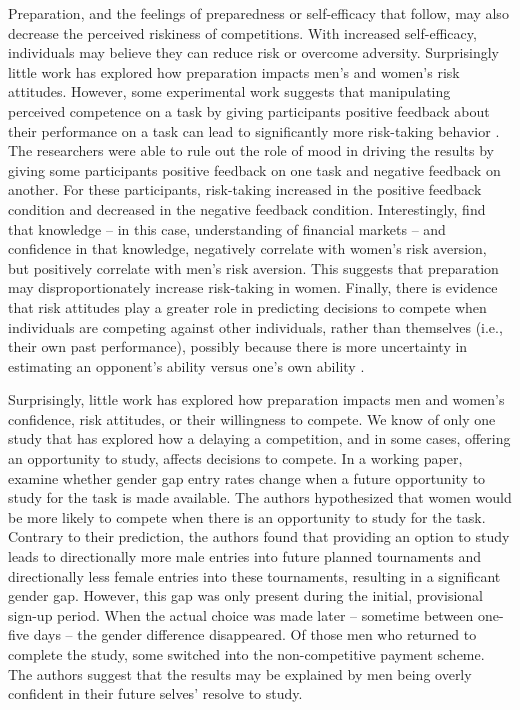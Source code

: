 \documentclass[a4paper, nobind]{templates/ociamthesis}
\begin{document}
Preparation, and the feelings of preparedness or self-efficacy that follow, may also decrease the perceived riskiness of competitions. With increased self-efficacy, individuals may believe they can reduce risk or overcome adversity. Surprisingly little work has explored how preparation impacts men's and women's risk attitudes. However, some experimental work suggests that manipulating perceived competence on a task by giving participants positive feedback about their performance on a task can lead to significantly more risk-taking behavior \autocite{Krueger1994}. The researchers were able to rule out the role of mood in driving the results by giving some participants positive feedback on one task and negative feedback on another. For these participants, risk-taking increased in the positive feedback condition and decreased in the negative feedback condition. Interestingly, \textcite{Gysler2002} find that knowledge -- in this case, understanding of financial markets -- and confidence in that knowledge, negatively correlate with women's risk aversion, but positively correlate with men's risk aversion. This suggests that preparation may disproportionately increase risk-taking in women. Finally, there is evidence that risk attitudes play a greater role in predicting decisions to compete when individuals are competing against other individuals, rather than themselves (i.e., their own past performance), possibly because there is more uncertainty in estimating an opponent's ability versus one's own ability \autocite{Apicella2017a}.

Surprisingly, little work has explored how preparation impacts men and women's confidence, risk attitudes, or their willingness to compete. We know of only one study that has explored how a delaying a competition, and in some cases, offering an opportunity to study, affects decisions to compete. In a working paper, \textcite{Charness2021} examine whether gender gap entry rates change when a future opportunity to study for the task is made available. The authors hypothesized that women would be more likely to compete when there is an opportunity to study for the task. Contrary to their prediction, the authors found that providing an option to study leads to directionally more male entries into future planned tournaments and directionally less female entries into these tournaments, resulting in a significant gender gap. However, this gap was only present during the initial, provisional sign-up period. When the actual choice was made later -- sometime between one-five days -- the gender difference disappeared. Of those men who returned to complete the study, some switched into the non-competitive payment scheme. The authors suggest that the results may be explained by men being overly confident in their future selves' resolve to study.
\end{document}
